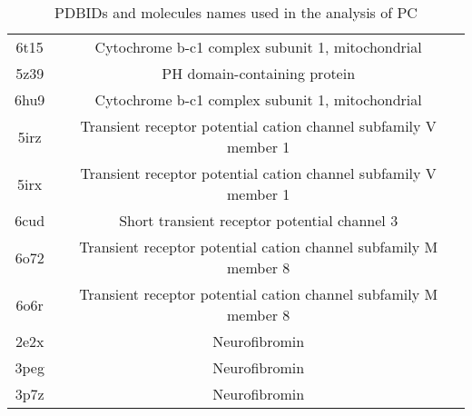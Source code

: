 \documentclass{article}
\begin{document}
\begin{table}[]
\begin{tabular}{c|c}
6t15 & Cytochrome b-c1 complex subunit 1, mitochondrial \\ 
5z39 & PH domain-containing protein \\ 
6hu9 & Cytochrome b-c1 complex subunit 1, mitochondrial \\ 
5irz & Transient receptor potential cation channel subfamily V member 1 \\ 
5irx & Transient receptor potential cation channel subfamily V member 1 \\ 
6cud & Short transient receptor potential channel 3 \\ 
6o72 & Transient receptor potential cation channel subfamily M member 8 \\ 
6o6r & Transient receptor potential cation channel subfamily M member 8 \\ 
2e2x & Neurofibromin \\ 
3peg & Neurofibromin \\ 
3p7z & Neurofibromin \\ 
    \end{tabular}
    \caption{PDBIDs and molecules names used in the analysis of PC}
    \label{tab:my_label}
\end{table}
\end{document}
